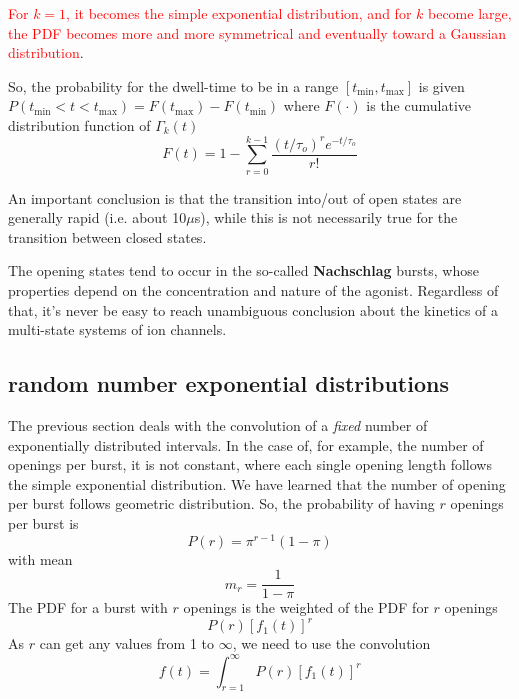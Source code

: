 \textcolor{red}{For $k=1$, it becomes the simple exponential
  distribution, and for $k$ become large, the PDF becomes more and
  more symmetrical and eventually toward a Gaussian distribution}.

So, the probability for the dwell-time to be in a range
$[t_\min, t_\max]$ is given $P(t_\min < t <t_\max) = F(t_\max)-F(t_\min)$
where $F(\cdot)$ is the cumulative distribution function of $\Gamma_k(t)$
\begin{equation}
  \label{eq:885}
  F(t) = 1-\sum_{r=0}^{k-1}\frac{(t/\tau_o)^r e^{-t/\tau_o}}{r!}
\end{equation}

An important conclusion is that the transition into/out of open states
are generally rapid (i.e. about 10$\mu$s), while this is not
necessarily true for the transition between closed states.

The opening states tend to occur in the so-called {\bf Nachschlag}
bursts, whose properties depend on the concentration and nature of the
agonist. Regardless of that, it's never be easy to reach unambiguous
conclusion about the kinetics of a multi-state systems of ion
channels.

\subsection{random number exponential distributions}
\label{sec:distr-sum-rand}

The previous section deals with the convolution of a {\it fixed}
number of exponentially distributed intervals. In the case of, for
example, the number of openings per burst, it is not constant, where
each single opening length follows the simple exponential
distribution. We have learned that the number of opening per burst
follows geometric distribution. So, the probability of having $r$
openings per burst is
\begin{equation}
  \label{eq:915}
  P(r) = \pi^{r-1}(1-\pi)
\end{equation}
with mean
\begin{equation}
  \label{eq:916}
  m_r = \frac{1}{1-\pi}
\end{equation}
The PDF for a burst with $r$ openings is the weighted of the PDF for
$r$ openings
\begin{equation}
  \label{eq:923}
  P(r) \left[f_1(t)\right]^r
\end{equation}
As $r$ can get any values from 1 to $\infty$, we need to use the
convolution
\begin{equation}
  \label{eq:924}
  f(t) = \int_{r=1}^\infty P(r) \left[f_1(t)\right]^r
\end{equation}

